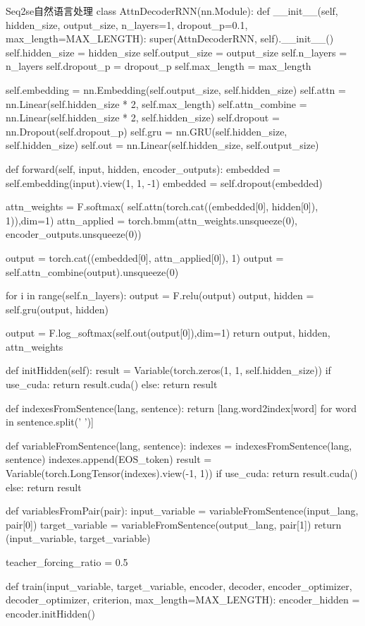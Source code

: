 \documentclass[openbib]{article}
\begin{document}
\begin{Python}{Seq2se自然语言处理}
class AttnDecoderRNN(nn.Module):
	def __init__(self, hidden_size, output_size, n_layers=1, dropout_p=0.1, max_length=MAX_LENGTH):
		super(AttnDecoderRNN, self).__init__()
		self.hidden_size = hidden_size
		self.output_size = output_size
		self.n_layers = n_layers
		self.dropout_p = dropout_p
		self.max_length = max_length

		self.embedding = nn.Embedding(self.output_size, self.hidden_size)
		self.attn = nn.Linear(self.hidden_size * 2, self.max_length)
		self.attn_combine = nn.Linear(self.hidden_size * 2, self.hidden_size)
		self.dropout = nn.Dropout(self.dropout_p)
		self.gru = nn.GRU(self.hidden_size, self.hidden_size)
		self.out = nn.Linear(self.hidden_size, self.output_size)

	def forward(self, input, hidden, encoder_outputs):
		embedded = self.embedding(input).view(1, 1, -1)
		embedded = self.dropout(embedded)

		attn_weights = F.softmax(
		self.attn(torch.cat((embedded[0], hidden[0]), 1)),dim=1)
		attn_applied = torch.bmm(attn_weights.unsqueeze(0),
								encoder_outputs.unsqueeze(0))

		output = torch.cat((embedded[0], attn_applied[0]), 1)
		output = self.attn_combine(output).unsqueeze(0)

		for i in range(self.n_layers):
			output = F.relu(output)
			output, hidden = self.gru(output, hidden)

		output = F.log_softmax(self.out(output[0]),dim=1)
		return output, hidden, attn_weights

	def initHidden(self):
		result = Variable(torch.zeros(1, 1, self.hidden_size))
		if use_cuda:
			return result.cuda()
		else:
			return result

def indexesFromSentence(lang, sentence):
	return [lang.word2index[word] for word in sentence.split(' ')]

def variableFromSentence(lang, sentence):
	indexes = indexesFromSentence(lang, sentence)
	indexes.append(EOS_token)
	result = Variable(torch.LongTensor(indexes).view(-1, 1))
	if use_cuda:
		return result.cuda()
	else:
		return result

def variablesFromPair(pair):
	input_variable = variableFromSentence(input_lang, pair[0])
	target_variable = variableFromSentence(output_lang, pair[1])
	return (input_variable, target_variable)

teacher_forcing_ratio = 0.5

def train(input_variable, target_variable, encoder, decoder, encoder_optimizer, decoder_optimizer, criterion, 	max_length=MAX_LENGTH):
	encoder_hidden = encoder.initHidden()


\end{Python}
\end{document}

